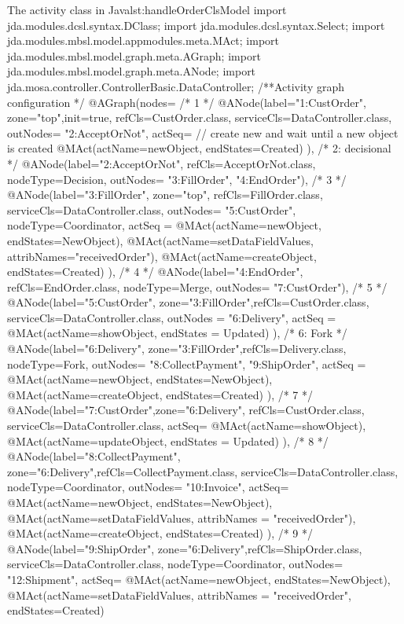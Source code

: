 \begin{lstcodeplainssm}{The activity class  in Java}{lst:handleOrderClsModel}
import jda.modules.dcsl.syntax.DClass;
import jda.modules.dcsl.syntax.Select;
import jda.modules.mbsl.model.appmodules.meta.MAct;
import jda.modules.mbsl.model.graph.meta.AGraph;
import jda.modules.mbsl.model.graph.meta.ANode;
import jda.mosa.controller.ControllerBasic.DataController;
/**Activity graph configuration */
@AGraph(nodes={
	/* 1 */    
	@ANode(label="1:CustOrder", zone="top",init=true, 
	refCls=CustOrder.class, serviceCls=DataController.class, 
	outNodes= {"2:AcceptOrNot"},
	actSeq={
		// create new and wait until a new object is created
		@MAct(actName=newObject, endStates={Created})
	}),
	/* 2: decisional */    
	@ANode(label="2:AcceptOrNot", 
	refCls=AcceptOrNot.class, nodeType=Decision, 
	outNodes= {"3:FillOrder", "4:EndOrder"}),
	/* 3 */    
	@ANode(label="3:FillOrder", zone="top", refCls=FillOrder.class, serviceCls=DataController.class,
	outNodes= {"5:CustOrder"},
	nodeType=Coordinator,
	actSeq = {
		@MAct(actName=newObject, endStates={NewObject}),
		@MAct(actName=setDataFieldValues, attribNames={"receivedOrder"}),
		@MAct(actName=createObject, endStates={Created})
	}),
	/* 4 */    
	@ANode(label="4:EndOrder", refCls=EndOrder.class, 
	nodeType=Merge, outNodes= {"7:CustOrder"}),
	/* 5 */    
	@ANode(label="5:CustOrder", zone="3:FillOrder",refCls=CustOrder.class, serviceCls=DataController.class,
	outNodes = {"6:Delivery"},
	actSeq = {
		@MAct(actName=showObject, endStates = {Updated})
	}),
	/* 6: Fork */    
	@ANode(label="6:Delivery", zone="3:FillOrder",refCls=Delivery.class, 
	nodeType=Fork, outNodes= {"8:CollectPayment", "9:ShipOrder"},
	actSeq = {
		@MAct(actName=newObject, endStates={NewObject}),
		@MAct(actName=createObject, endStates={Created})      
	}
	),
	/* 7 */    
	@ANode(label="7:CustOrder",zone="6:Delivery", refCls=CustOrder.class, serviceCls=DataController.class, 
	actSeq={
		@MAct(actName=showObject),
		@MAct(actName=updateObject, endStates = {Updated})
	}),
	/* 8 */    
	@ANode(label="8:CollectPayment", zone="6:Delivery",refCls=CollectPayment.class, 
	serviceCls=DataController.class,
	nodeType=Coordinator,
	outNodes= {"10:Invoice"},
	actSeq={
		@MAct(actName=newObject, endStates={NewObject}),
		@MAct(actName=setDataFieldValues, attribNames = {"receivedOrder"}),
		@MAct(actName=createObject, endStates={Created})
	}),
	/* 9 */    
	@ANode(label="9:ShipOrder", zone="6:Delivery",refCls=ShipOrder.class, serviceCls=DataController.class,
	nodeType=Coordinator,
	outNodes= {"12:Shipment"},
	actSeq={
		@MAct(actName=newObject, endStates={NewObject}),
		@MAct(actName=setDataFieldValues, attribNames = {"receivedOrder"}, endStates={Created})
}}
\end{lstcodeplainssm}
